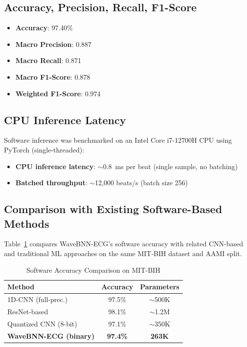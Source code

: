 \documentclass[conference]{IEEEtran}
\begin{document}
\subsection{Accuracy, Precision, Recall, F1-Score}

\begin{itemize}
    \item \textbf{Accuracy}: 97.40\%
    \item \textbf{Macro Precision}: 0.887
    \item \textbf{Macro Recall}: 0.871
    \item \textbf{Macro F1-Score}: 0.878
    \item \textbf{Weighted F1-Score}: 0.974
\end{itemize}

\subsection{CPU Inference Latency}

Software inference was benchmarked on an Intel Core i7-12700H CPU using PyTorch (single-threaded):
\begin{itemize}
    \item \textbf{CPU inference latency}: $\sim$0.8~ms per beat (single sample, no batching)
    \item \textbf{Batched throughput}: $\sim$12,000 beats/s (batch size 256)
\end{itemize}

\subsection{Comparison with Existing Software-Based Methods}

Table~\ref{tab:sw_comparison} compares WaveBNN-ECG's software accuracy with related CNN-based and traditional ML approaches on the same MIT-BIH dataset and AAMI split.

\begin{table}[htbp]
    \centering
    \caption{Software Accuracy Comparison on MIT-BIH}
    \label{tab:sw_comparison}
    \begin{tabular}{lcc}
        \toprule
        \textbf{Method} & \textbf{Accuracy} & \textbf{Parameters} \\
        \midrule
        1D-CNN (full-prec.)~\cite{kachuee2018ecg} & 97.5\% & $\sim$500K \\
        ResNet-based~\cite{he2016deep} & 98.1\% & $\sim$1.2M \\
        Quantized CNN (8-bit)~\cite{bozza2023ecg} & 97.1\% & $\sim$350K \\
        \textbf{WaveBNN-ECG (binary)} & \textbf{97.4\%} & \textbf{263K} \\
        \bottomrule
    \end{tabular}
\end{table}
\end{document}
